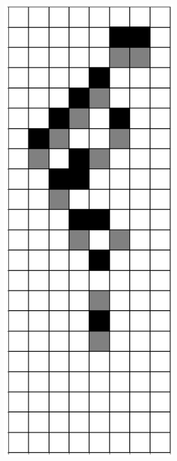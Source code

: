 \documentclass[12pt]{article}
\numberwithin{figure}{section} %
\begin{document}
\begin{figure}[H]
\begin{subfigure}{0.18\textwidth}
     		\subcaption{}
   	\end{subfigure}
        	\begin{subfigure}{0.18\textwidth}
     		\centering
     		\includegraphics[width=\linewidth]{Section4/20.4}

\end{subfigure}
\end{figure}
\end{document}
